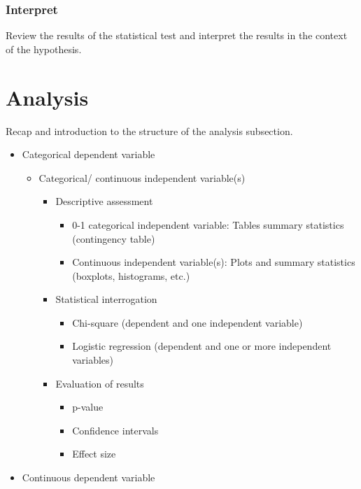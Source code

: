 \documentclass[
  letterpaper,
]{scrbook}
\providecommand{\tightlist}{%
  \setlength{\itemsep}{0pt}\setlength{\parskip}{0pt}}\usepackage{longtable,booktabs,array}
\begin{document}
\hypertarget{ida-interpret}{%
\subsubsection{Interpret}\label{ida-interpret}}

Review the results of the statistical test and interpret the results in
the context of the hypothesis.

\hypertarget{ida-analysis}{%
\section{Analysis}\label{ida-analysis}}

Recap and introduction to the structure of the analysis subsection.

\begin{itemize}
\tightlist
\item
  Categorical dependent variable

  \begin{itemize}
  \tightlist
  \item
    Categorical/ continuous independent variable(s)

    \begin{itemize}
    \tightlist
    \item
      Descriptive assessment

      \begin{itemize}
      \tightlist
      \item
        0-1 categorical independent variable: Tables summary statistics
        (contingency table)
      \item
        Continuous independent variable(s): Plots and summary statistics
        (boxplots, histograms, etc.)
      \end{itemize}
    \item
      Statistical interrogation

      \begin{itemize}
      \tightlist
      \item
        Chi-square (dependent and one independent variable)
      \item
        Logistic regression (dependent and one or more independent
        variables)
      \end{itemize}
    \item
      Evaluation of results

      \begin{itemize}
      \tightlist
      \item
        p-value
      \item
        Confidence intervals
      \item
        Effect size
      \end{itemize}
    \end{itemize}
  \end{itemize}
\item
  Continuous dependent variable


\end{itemize}
\end{document}
